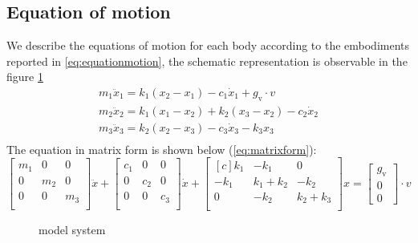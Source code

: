 \subsection{Equation of motion}
\label{subsec:equationofomotion}
We describe the equations of motion for each body according to the embodiments
reported in \eqref{eq:equationmotion}, the schematic representation is
observable in the figure \ref{fig:modelscheme}
%
\begin{equation}
	\label{eq:equationmotion}
	\begin{array}{l}
		m_1 \ddot{x}_{1} = k_1 (x_2 - x_1) - c_1 \dot{x}_{1} + g_{\text{v}} \cdot v	\\
		m_2 \ddot{x}_{2} = k_1 (x_1 - x_2) + k_2 (x_3 - x_2) - c_2 \dot{x}_{2} \\
		m_3 \ddot{x}_{3} = k_2 (x_2 - x_3) - c_3 \dot{x}_{3} - k_3 x_3	\\
	\end{array}
\end{equation}
%
The equation in matrix form is shown below (\ref{eq:matrixform}):
%
\begin{equation}
	\label{eq:matrixform}
	\begin{bmatrix}
		m_1	&  	0	&	0	\\
 		0	& 	m_2	&	0	\\
 		0	&  	0	&	m_3	\\
	\end{bmatrix}
	\ddot{x}+
	\begin{bmatrix}
		c_1	&	0	&	0	\\
  		0	&	c_2	&  	0	\\
  		0	&	0	& 	c_3	\\
	\end{bmatrix}
	\dot{x}+
	\begin{bmatrix*}[c]
		k_1		&	-k_1			&       0	\\
 		-k_1		& 	k_1 + k_2	&     -k_2	\\
  		0		&	-k_2			& k_2 + k_3	\\
	 \end{bmatrix*}
 	x=\begin{bmatrix}
 	g_{\text{v}}	\\
 	0 	\\
 	0
 	\end{bmatrix} \cdot v
\end{equation}
%
\begin{figure}[hb]
	\centering
    \resizebox{.8\linewidth}{!}{}
	\caption{model system}
	\label{fig:modelscheme}
\end{figure}
